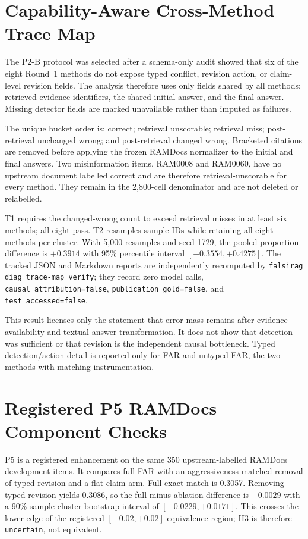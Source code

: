\section{Capability-Aware Cross-Method Trace Map}
\label{app:stage-trace}

The P2-B protocol was selected after a schema-only audit showed that six of the
eight Round~1 methods do not expose typed conflict, revision action, or
claim-level revision fields. The analysis therefore uses only fields shared by
all methods: retrieved evidence identifiers, the shared initial answer, and the
final answer. Missing detector fields are marked unavailable rather than imputed
as failures.

The unique bucket order is: correct; retrieval unscorable; retrieval miss;
post-retrieval unchanged wrong; and post-retrieval changed wrong. Bracketed
citations are removed before applying the frozen RAMDocs normalizer to the
initial and final answers. Two misinformation items, RAM0008 and RAM0060, have
no upstream document labelled correct and are therefore retrieval-unscorable
for every method. They remain in the 2,800-cell denominator and are not deleted
or relabelled.

T1 requires the changed-wrong count to exceed retrieval misses in at least six
methods; all eight pass. T2 resamples sample IDs while retaining all eight
methods per cluster. With 5,000 resamples and seed 1729, the pooled proportion
difference is $+0.3914$ with 95\% percentile interval
$[+0.3554,+0.4275]$. The tracked JSON and Markdown reports are independently
recomputed by \texttt{falsirag diag trace-map verify}; they record zero model
calls, \texttt{causal\_attribution=false},
\texttt{publication\_gold=false}, and \texttt{test\_accessed=false}.

This result licenses only the statement that error mass remains after evidence
availability and textual answer transformation. It does not show that detection
was sufficient or that revision is the independent causal bottleneck. Typed
detection/action detail is reported only for FAR and untyped FAR, the two methods
with matching instrumentation.

\section{Registered P5 RAMDocs Component Checks}
\label{app:p5}

P5 is a registered enhancement on the same 350 upstream-labelled RAMDocs
development items. It compares full FAR with an aggressiveness-matched removal
of typed revision and a flat-claim arm. Full exact match is 0.3057. Removing
typed revision yields 0.3086, so the full-minus-ablation difference is
$-0.0029$ with a 90\% sample-cluster bootstrap interval of
$[-0.0229,+0.0171]$. This crosses the lower edge of the registered
$[-0.02,+0.02]$ equivalence region; H3 is therefore \texttt{uncertain}, not
equivalent.


